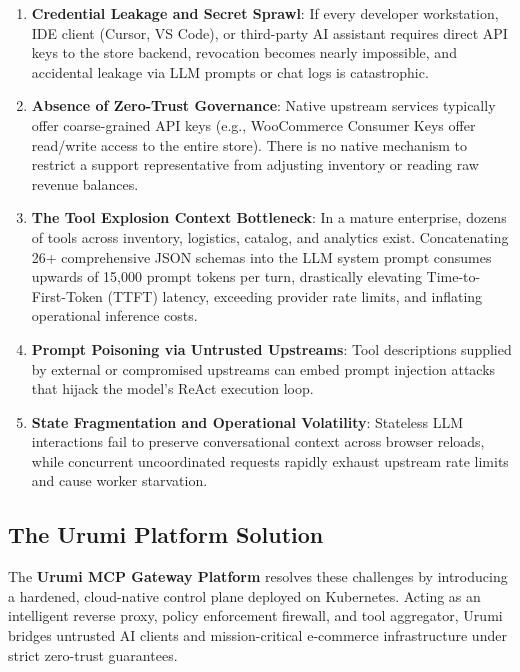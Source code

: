 \documentclass[11pt,a4paper]{article}
\begin{document}
\begin{enumerate}[leftmargin=*]
    \item \textbf{Credential Leakage and Secret Sprawl}: If every developer workstation, IDE client (Cursor, VS Code), or third-party AI assistant requires direct API keys to the store backend, revocation becomes nearly impossible, and accidental leakage via LLM prompts or chat logs is catastrophic.
    \item \textbf{Absence of Zero-Trust Governance}: Native upstream services typically offer coarse-grained API keys (e.g., WooCommerce Consumer Keys offer read/write access to the entire store). There is no native mechanism to restrict a support representative from adjusting inventory or reading raw revenue balances.
    \item \textbf{The Tool Explosion Context Bottleneck}: In a mature enterprise, dozens of tools across inventory, logistics, catalog, and analytics exist. Concatenating 26+ comprehensive JSON schemas into the LLM system prompt consumes upwards of 15,000 prompt tokens per turn, drastically elevating Time-to-First-Token (TTFT) latency, exceeding provider rate limits, and inflating operational inference costs.
    \item \textbf{Prompt Poisoning via Untrusted Upstreams}: Tool descriptions supplied by external or compromised upstreams can embed prompt injection attacks that hijack the model's ReAct execution loop.
    \item \textbf{State Fragmentation and Operational Volatility}: Stateless LLM interactions fail to preserve conversational context across browser reloads, while concurrent uncoordinated requests rapidly exhaust upstream rate limits and cause worker starvation.
\end{enumerate}

\subsection{The Urumi Platform Solution}
The \textbf{Urumi MCP Gateway Platform} resolves these challenges by introducing a hardened, cloud-native control plane deployed on Kubernetes. Acting as an intelligent reverse proxy, policy enforcement firewall, and tool aggregator, Urumi bridges untrusted AI clients and mission-critical e-commerce infrastructure under strict zero-trust guarantees.

\end{document}
